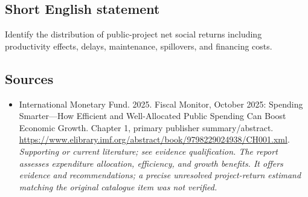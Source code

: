 \documentclass[11pt]{article}
\begin{document}
\subsection{Short English statement}
Identify the distribution of public-project net social returns including productivity effects, delays, maintenance, spillovers, and financing costs.

\subsection{Sources}
\begin{itemize}\raggedright
\item[\textnormal{[S1]}]\hypertarget{source:30007533:1}{} International Monetary Fund. 2025. Fiscal Monitor, October 2025: Spending Smarter—How Efficient and Well-Allocated Public Spending Can Boost Economic Growth. Chapter 1, primary publisher summary/abstract.
\url{https://www.elibrary.imf.org/abstract/book/9798229024938/CH001.xml}.
{\small\textit{Supporting or current literature; see evidence qualification. The report assesses expenditure allocation, efficiency, and growth benefits. It offers evidence and recommendations; a precise unresolved project-return estimand matching the original catalogue item was not verified.}}
\end{itemize}
\end{document}
